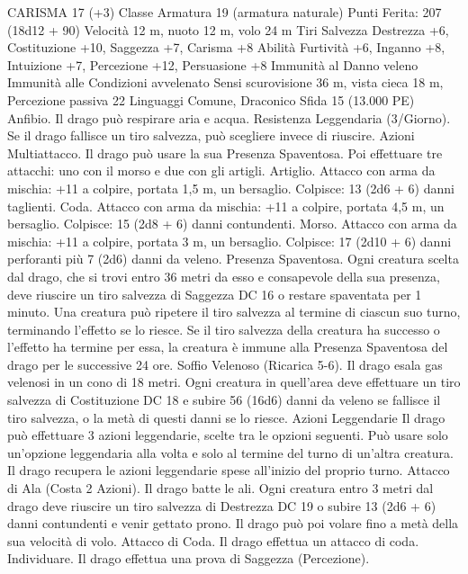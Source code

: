 \begin{multicols}{2}
CARISMA 17 (+3)
Classe Armatura 19 (armatura naturale)
\hspace*{0pt}\hfill{Punti Ferita}: 207 (18d12 + 90)
Velocità 12 m, nuoto 12 m, volo 24 m
Tiri Salvezza Destrezza +6, Costituzione +10, Saggezza +7,
Carisma +8
Abilità Furtività +6, Inganno +8, Intuizione +7, Percezione +12,
Persuasione +8
Immunità al Danno veleno
Immunità alle Condizioni avvelenato
Sensi scurovisione 36 m, vista cieca 18 m, Percezione passiva 22
Linguaggi Comune, Draconico
Sfida 15 (13.000 PE)
Anfibio. Il drago può respirare aria e acqua.
Resistenza Leggendaria (3/Giorno). Se il drago fallisce un tiro
salvezza, può scegliere invece di riuscire.
Azioni
Multiattacco. Il drago può usare la sua Presenza Spaventosa. Poi
effettuare tre attacchi: uno con il morso e due con gli artigli.
Artiglio. Attacco con arma da mischia: +11 a colpire, portata 1,5
m, un bersaglio.
Colpisce: 13 (2d6 + 6) danni taglienti.
Coda. Attacco con arma da mischia: +11 a colpire, portata 4,5
m, un bersaglio.
Colpisce: 15 (2d8 + 6) danni contundenti.
Morso. Attacco con arma da mischia: +11 a colpire, portata 3 m,
un bersaglio.
Colpisce: 17 (2d10 + 6) danni perforanti più 7 (2d6) danni da veleno.
Presenza Spaventosa. Ogni creatura scelta dal drago, che si trovi
entro 36 metri da esso e consapevole della sua presenza, deve
riuscire un tiro salvezza di Saggezza DC 16 o restare spaventata per
1 minuto. Una creatura può ripetere il tiro salvezza al termine di
ciascun suo turno, terminando l’effetto se lo riesce. Se il tiro salvezza
della creatura ha successo o l’effetto ha termine per essa, la creatura è
immune alla Presenza Spaventosa del drago per le successive 24 ore.
Soffio Velenoso (Ricarica 5-6). Il drago esala gas velenosi in un
cono di 18 metri. Ogni creatura in quell’area deve effettuare un tiro
salvezza di Costituzione DC 18 e subire 56 (16d6) danni da veleno se
fallisce il tiro salvezza, o la metà di questi danni se lo riesce.
Azioni Leggendarie
Il drago può effettuare 3 azioni leggendarie, scelte tra le opzioni
seguenti. Può usare solo un’opzione leggendaria alla volta e solo
al termine del turno di un’altra creatura. Il drago recupera le
azioni leggendarie spese all’inizio del proprio turno.
Attacco di Ala (Costa 2 Azioni). Il drago batte le ali. Ogni
creatura entro 3 metri dal drago deve riuscire un tiro salvezza di
Destrezza DC 19 o subire 13 (2d6 + 6) danni contundenti e venir
gettato prono. Il drago può poi volare fino a metà della sua
velocità di volo.
Attacco di Coda. Il drago effettua un attacco di coda.
Individuare. Il drago effettua una prova di Saggezza
(Percezione).

\end{multicols}
